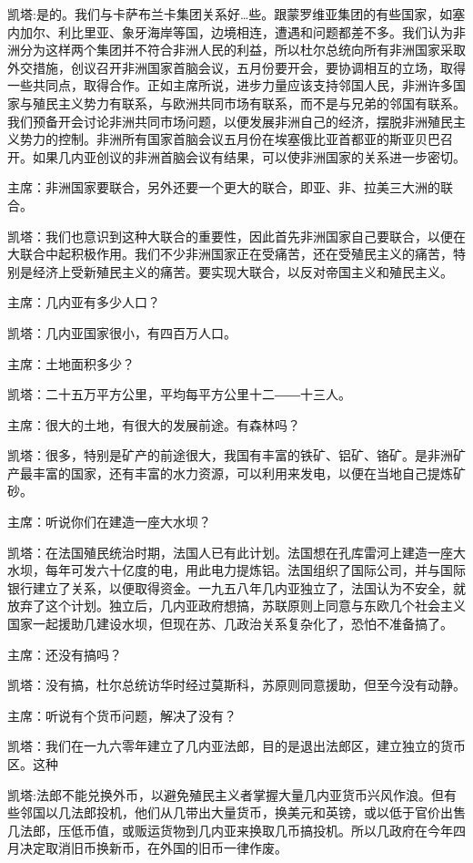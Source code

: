 凯塔:是的。我们与卡萨布兰卡集团关系好…些。跟蒙罗维亚集团的有些国家，如塞内加尔、利比里亚、象牙海岸等国，边境相连，遭遇和问题都差不多。我们认为非洲分为这样两个集团并不符合非洲人民的利益，所以杜尔总统向所有非洲国家采取外交措施，创议召开非洲国家首脑会议，五月份要开会，要协调相互的立场，取得一些共同点，取得合作。正如主席所说，进步力量应该支持邻国人民，非洲许多国家与殖民主义势力有联系，与欧洲共同市场有联系，而不是与兄弟的邻国有联系。我们预备开会讨论非洲共同市场问题，以便发展非洲自己的经济，摆脱非洲殖民主义势力的控制。非洲所有国家首脑会议五月份在埃塞俄比亚首都亚的斯亚贝巴召开。如果几内亚创议的非洲首脑会议有结果，可以使非洲国家的关系进一步密切。

主席：非洲国家要联合，另外还要一个更大的联合，即亚、非、拉美三大洲的联合。

凯塔：我们也意识到这种大联合的重要性，因此首先非洲国家自己要联合，以便在大联合中起积极作用。我们不少非洲国家正在受痛苦，还在受殖民主义的痛苦，特别是经济上受新殖民主义的痛苦。要实现大联合，以反对帝国主义和殖民主义。

主席：几内亚有多少人口？

凯塔：几内亚国家很小，有四百万人口。

主席：土地面积多少？

凯塔：二十五万平方公里，平均每平方公里十二――十三人。

主席：很大的土地，有很大的发展前途。有森林吗？

凯塔：很多，特别是矿产的前途很大，我国有丰富的铁矿、铝矿、铬矿。是非洲矿产最丰富的国家，还有丰富的水力资源，可以利用来发电，以便在当地自己提炼矿砂。

主席：听说你们在建造一座大水坝？

凯塔：在法国殖民统治时期，法国人已有此计划。法国想在孔库雷河上建造一座大水坝，每年可发六十亿度的电，用此电力提炼铝。法国组织了国际公司，并与国际银行建立了关系，以便取得资金。一九五八年几内亚独立了，法国认为不安全，就放弃了这个计划。独立后，几内亚政府想搞，苏联原则上同意与东欧几个社会主义国家一起援助几建设水坝，但现在苏、几政治关系复杂化了，恐怕不准备搞了。

主席：还没有搞吗？

凯塔：没有搞，杜尔总统访华时经过莫斯科，苏原则同意援助，但至今没有动静。

主席：听说有个货币问题，解决了没有？

凯塔：我们在一九六零年建立了几内亚法郎，目的是退出法郎区，建立独立的货币区。这种

凯塔:法郎不能兑换外币，以避免殖民主义者掌握大量几内亚货币兴风作浪。但有些邻国以几法郎投机，他们从几带出大量货币，换美元和英镑，或以低于官价出售几法郎，压低币值，或贩运货物到几内亚来换取几币搞投机。所以几政府在今年四月决定取消旧币换新币，在外国的旧币一律作废。

